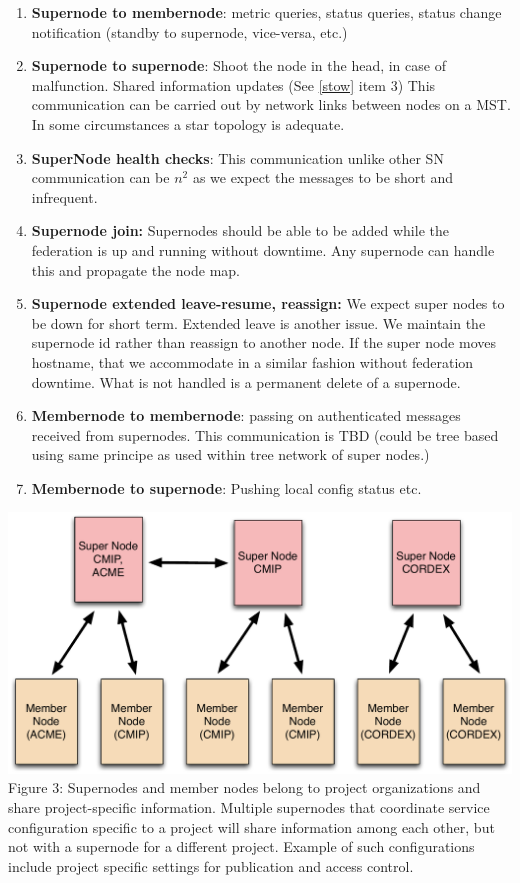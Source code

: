\documentclass[oneside,12pt]{memoir}
\begin{document}
\begin{enumerate}
\item \textbf{Supernode to membernode}: metric queries, status queries, status change notification (standby to supernode, vice-versa, etc.)
\item \textbf{Supernode to supernode}: Shoot the node in the head, in case of malfunction.  Shared information updates (See \ref{stow} item 3)  This communication can be carried out by network links between nodes on a MST.   In some circumstances a star topology is adequate.  
\item \textbf{SuperNode health checks}:  This communication unlike other SN communication can be $n^2$ as we expect the messages to be short and infrequent.   
\item \textbf{Supernode join:}  Supernodes should be able to be added while the federation is up and running without downtime.  Any supernode can handle this and propagate the node map.

\item \textbf{Supernode extended leave-resume, reassign:}  We expect super nodes to be down for short term.  Extended leave is another issue. We maintain the supernode id rather than reassign to another node.  If the super node moves hostname, that we accommodate in a similar fashion without federation downtime.  What is not handled is a permanent delete of a supernode.  


\item \textbf{Membernode to membernode}: passing on authenticated messages received from supernodes.  This communication is TBD (could be tree based using same principe as used within tree network of super nodes.) %
\item \textbf{Membernode to supernode}: Pushing local config status etc.
\end{enumerate}

\begin{center}
\includegraphics[width=\textwidth]{presentation/ESG-node-org.pdf}
Figure 3: Supernodes and member nodes belong to project organizations and share project-specific information.   Multiple supernodes that coordinate service configuration specific to a project will share information among each other, but not with a supernode for a different project.  Example of such configurations include project specific settings for publication and access control.
\end{center}
\end{document}
